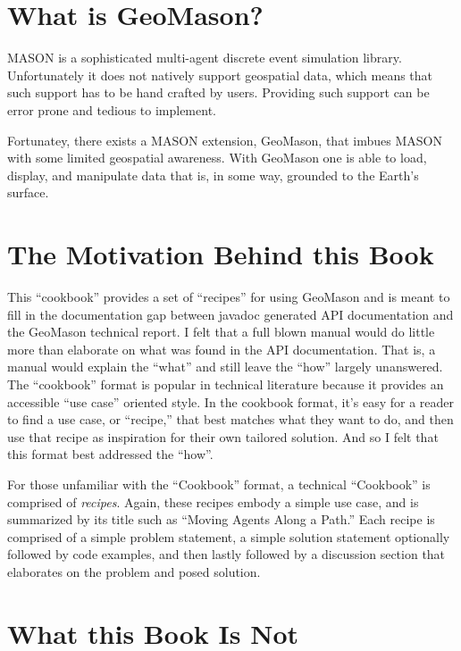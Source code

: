 \documentclass[twoside,10pt]{book}
\begin{document}
\section{What is GeoMason?}
MASON is a sophisticated multi-agent discrete event simulation library.
Unfortunately it does not natively support geospatial data, which
means that such support has to be hand crafted by users.  Providing
such support can be error prone and tedious to implement.

Fortunatey, there exists a MASON extension, GeoMason, that imbues
MASON with some limited geospatial awareness.  With GeoMason one is
able to load, display, and manipulate data that is, in some way,
grounded to the Earth's surface.
\section{The Motivation Behind this Book}
This ``cookbook'' provides a set of ``recipes'' for using GeoMason and is
meant to fill in the documentation gap between javadoc generated API
documentation and the GeoMason technical report.  I felt that a full
blown manual would do little more than elaborate on what was found in
the API documentation.  That is, a manual would explain the
``what'' and still leave the ``how'' largely unanswered.  The ``cookbook''
format is popular in technical literature because it provides an
accessible ``use case'' oriented style.  In the cookbook format, it's
easy for a reader to find a use case, or ``recipe,'' that best matches what
they want to do, and then use that recipe as inspiration for their own
tailored solution.  And so I felt that this format best addressed the
``how''.

For those unfamiliar with the ``Cookbook'' format, a technical
``Cookbook'' is comprised of \emph{recipes}.  Again, these recipes
embody a simple use case, and is summarized by its title such as
``Moving Agents Along a Path.''  Each recipe is comprised of a simple
problem statement, a simple solution statement optionally followed by
code examples, and then lastly followed by a discussion section that
elaborates on the problem and posed solution.

\section{What this Book Is Not}
\end{document}
